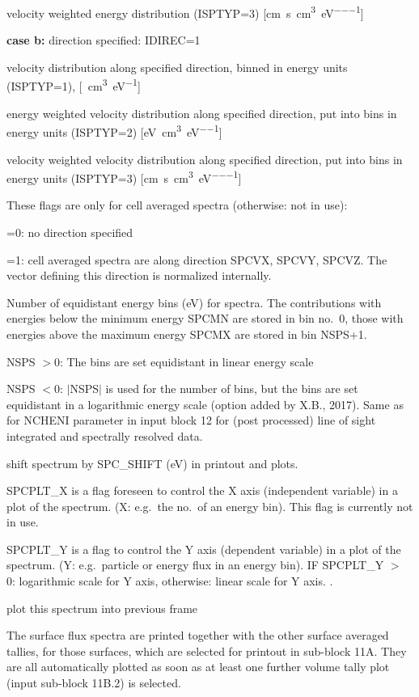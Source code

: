 \begin{description}
        velocity weighted energy distribution (ISPTYP=3)
        [\si{\centi\metre\per\second\per\cubic\centi\metre\per\electronvolt}]

        \textbf{case b:} direction specified: IDIREC=1 

        velocity distribution along specified direction, binned in energy units
        (ISPTYP=1), [\si{\per\cubic\centi\metre\per\electronvolt}] 

        energy weighted velocity distribution along specified direction, put into bins
        in energy units (ISPTYP=2)
        [\si{\electronvolt\per\cubic\centi\metre\per\electronvolt}] 

        velocity weighted velocity distribution along specified direction, put into
        bins in energy units (ISPTYP=3)
        [\si{\centi\metre\per\second\per\cubic\centi\metre\per\electronvolt}]

  \item[IDIREC, SPCVX, SPCVY, SPCVZ] 

        These flags are only for cell averaged spectra (otherwise: not in use):

        =0: no direction specified

        =1: cell averaged spectra are along direction SPCVX, SPCVY, SPCVZ.
        The vector defining this direction is normalized internally.

  \item[NSPS, SPCMN, SPCMX] Number of equidistant energy bins
        (\si{\electronvolt}) for spectra.
        The contributions with energies below the minimum energy SPCMN are stored in
        bin no.\ 0, those with energies above the maximum energy SPCMX are stored in
        bin NSPS+1.

        NSPS $> 0$:  The bins are set equidistant in linear energy scale

        NSPS $< 0$:  $\mid$NSPS$\mid$ is used for the number of bins, but the bins are
        set equidistant in a logarithmic energy scale (option added by X.B., 2017).
        Same as for NCHENI parameter in input block 12 for (post processed) line of
        sight integrated and spectrally resolved data.

  \item[SPC\_SHIFT] shift spectrum by SPC\_SHIFT (\si{\electronvolt}) in printout
        and plots.

  \item[SPCPLT\_X, SPCPLT\_Y] SPCPLT\_X is a flag foreseen to control the X axis
        (independent variable) in a plot of the spectrum.
        (X: e.g.\ the no.\ of an energy bin).
        This flag is currently not in use.

        SPCPLT\_Y is a flag to control the Y axis (dependent variable) in a plot of the
        spectrum.
        (Y: e.g.\ particle or energy flux in an energy bin).
        IF SPCPLT\_Y $>$ 0: logarithmic scale for Y axis, otherwise: linear scale for Y
        axis.
        .

  \item[SPCPLT\_SAME] plot this spectrum into previous frame
\end{description}
The surface flux spectra are printed together with the other surface averaged
tallies, for those surfaces, which are selected for printout in sub-block 11A.
They are all automatically plotted as soon as at least one further volume tally
plot (input sub-block 11B.2) is selected.
